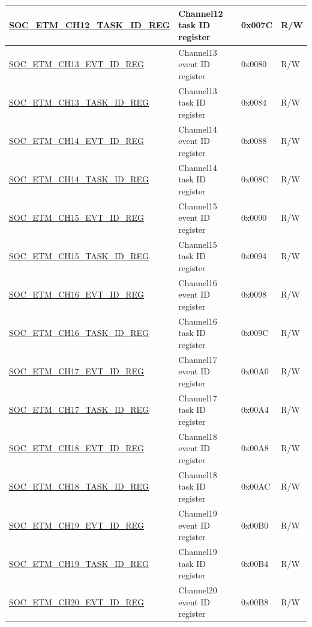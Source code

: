 \begin{longtable}{ | p{6cm} | p{6.4cm} | p{1.3cm} | p{1.8cm} | }
\hyperref[regdesc:SOCETMCH0TASKIDREG]{SOC\_ETM\_CH12\_TASK\_ID\_REG} & Channel12 task ID register & 0x007C & R/W \\ \hline
\hyperref[regdesc:SOCETMCH0EVTIDREG]{SOC\_ETM\_CH13\_EVT\_ID\_REG} & Channel13 event ID register & 0x0080 & R/W \\ \hline
\hyperref[regdesc:SOCETMCH0TASKIDREG]{SOC\_ETM\_CH13\_TASK\_ID\_REG} & Channel13 task ID register & 0x0084 & R/W \\ \hline
\hyperref[regdesc:SOCETMCH0EVTIDREG]{SOC\_ETM\_CH14\_EVT\_ID\_REG} & Channel14 event ID register & 0x0088 & R/W \\ \hline
\hyperref[regdesc:SOCETMCH0TASKIDREG]{SOC\_ETM\_CH14\_TASK\_ID\_REG} & Channel14 task ID register & 0x008C & R/W \\ \hline
\hyperref[regdesc:SOCETMCH0EVTIDREG]{SOC\_ETM\_CH15\_EVT\_ID\_REG} & Channel15 event ID register & 0x0090 & R/W \\ \hline
\hyperref[regdesc:SOCETMCH0TASKIDREG]{SOC\_ETM\_CH15\_TASK\_ID\_REG} & Channel15 task ID register & 0x0094 & R/W \\ \hline
\hyperref[regdesc:SOCETMCH0EVTIDREG]{SOC\_ETM\_CH16\_EVT\_ID\_REG} & Channel16 event ID register & 0x0098 & R/W \\ \hline
\hyperref[regdesc:SOCETMCH0TASKIDREG]{SOC\_ETM\_CH16\_TASK\_ID\_REG} & Channel16 task ID register & 0x009C & R/W \\ \hline
\hyperref[regdesc:SOCETMCH0EVTIDREG]{SOC\_ETM\_CH17\_EVT\_ID\_REG} & Channel17 event ID register & 0x00A0 & R/W \\ \hline
\hyperref[regdesc:SOCETMCH0TASKIDREG]{SOC\_ETM\_CH17\_TASK\_ID\_REG} & Channel17 task ID register & 0x00A4 & R/W \\ \hline
\hyperref[regdesc:SOCETMCH0EVTIDREG]{SOC\_ETM\_CH18\_EVT\_ID\_REG} & Channel18 event ID register & 0x00A8 & R/W \\ \hline
\hyperref[regdesc:SOCETMCH0TASKIDREG]{SOC\_ETM\_CH18\_TASK\_ID\_REG} & Channel18 task ID register & 0x00AC & R/W \\ \hline
\hyperref[regdesc:SOCETMCH0EVTIDREG]{SOC\_ETM\_CH19\_EVT\_ID\_REG} & Channel19 event ID register & 0x00B0 & R/W \\ \hline
\hyperref[regdesc:SOCETMCH0TASKIDREG]{SOC\_ETM\_CH19\_TASK\_ID\_REG} & Channel19 task ID register & 0x00B4 & R/W \\ \hline
\hyperref[regdesc:SOCETMCH0EVTIDREG]{SOC\_ETM\_CH20\_EVT\_ID\_REG} & Channel20 event ID register & 0x00B8 & R/W \\ \hline

\end{longtable}
